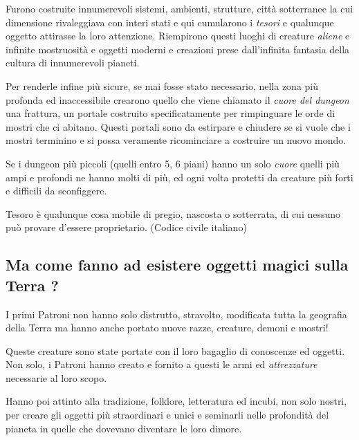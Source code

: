 \begin{multicols}{2}
Furono costruite innumerevoli sistemi, ambienti, strutture, città sotterranee la cui dimensione rivaleggiava con interi stati e qui cumularono i \emph{tesori} e qualunque oggetto attirasse la loro attenzione. Riempirono questi luoghi di creature \emph{aliene} e infinite mostruosità e oggetti moderni e creazioni prese dall'infinita fantasia della cultura di innumerevoli pianeti.

Per renderle infine più sicure, se mai fosse stato necessario, nella zona più profonda ed inaccessibile crearono quello che viene chiamato il \emph{cuore del dungeon} una frattura, un portale costruito specificatamente per rimpinguare le orde di mostri che ci abitano. Questi portali sono da estirpare e chiudere se si vuole che i mostri terminino e si possa veramente ricominciare a costruire un nuovo mondo.

Se i dungeon più piccoli (quelli entro 5, 6 piani) hanno un solo \emph{cuore} quelli più ampi e profondi ne hanno molti di più, ed ogni volta protetti da creature più forti e difficili da sconfiggere.

\medskip

\begin{changemargin}{0.3cm}{0.3cm}\begin{enfasi}

Tesoro è qualunque cosa mobile di pregio, nascosta o sotterrata, di cui nessuno può provare d'essere proprietario. (Codice civile italiano)

\end{enfasi}\end{changemargin}

\subsection*{Ma come fanno ad esistere oggetti magici sulla Terra ?}

I primi Patroni non hanno solo distrutto, stravolto, modificata tutta la geografia della Terra ma hanno anche portato nuove razze, creature, demoni e mostri!

Queste creature sono state portate con il loro bagaglio di conoscenze ed oggetti. Non solo, i Patroni hanno creato e fornito a questi le armi ed \emph{attrezzature} necessarie al loro scopo. 

Hanno poi attinto alla tradizione, folklore, letteratura ed incubi, non solo nostri, per creare gli oggetti più straordinari e unici e seminarli nelle profondità del pianeta in quelle che dovevano diventare le loro dimore.


\end{multicols}

